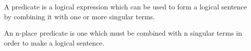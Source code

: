 A predicate is a logical expression which can be used to form a
logical sentence by combining it with one or more singular terms.
\par
An n-place predicate is one which must be combined with n
singular terms in order to make a logical sentence.
